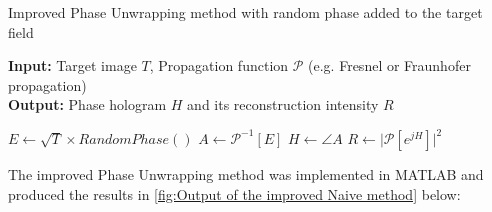\begin{algorithm}[H]
  \caption{Improved Phase Unwrapping method with random phase added to the target field}\label{alg:Naive algorithm with random phase}
  \textbf{Input:} Target image $T$, Propagation function $\mathcal{P}$ (e.g. Fresnel or Fraunhofer propagation)\\
  \textbf{Output:} Phase hologram $H$ and its reconstruction intensity $R$
  \begin{algorithmic}
    \State $E \gets \sqrt{T} \times RandomPhase()$
    \State $A \gets \mathcal{P}^{-1}[E]$
    \State $H \gets \angle A$
    \State $R \gets \vert \mathcal{P}[e^{jH}] \vert ^2 $
  \end{algorithmic}
\end{algorithm}

The improved Phase Unwrapping method was implemented in MATLAB and produced the results in \cref{fig:Output of the improved Naive method} below:

